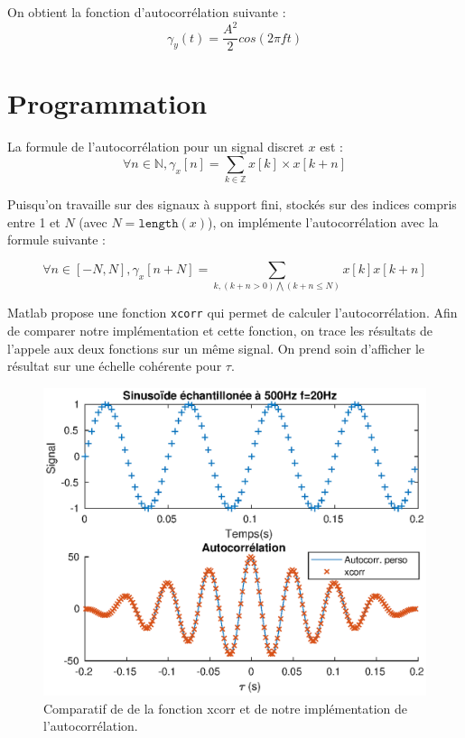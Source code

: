 \documentclass[french]{article}
\begin{document}
On obtient la fonction d'autocorrélation suivante :
\begin{equation}
\gamma_y (t) = \frac{A^2} {2} cos(2 \pi f t)
\end{equation}

\section{ Programmation}

La formule de l'autocorrélation pour un signal discret $x$ est :
\begin{equation}
\forall n \in \mathbb{N}, \gamma_x [n] = \sum_{k\in \mathbb{Z}} x[k] \times x[k+n]
\end{equation}

Puisqu'on travaille sur des signaux à support fini, stockés sur des indices compris entre 1 et $N$ (avec $N = \mathtt{length}(x)$), on implémente l'autocorrélation avec la formule suivante :

\begin{equation}
\forall n \in [-N,N], \gamma_x [n+N] = \sum_{k, (k+n>0) \bigwedge (k+n \leq N) } x[k]x[k+n]
\end{equation}

Matlab propose une fonction \verb`xcorr` qui permet de calculer l'autocorrélation. Afin de comparer notre implémentation et cette fonction, on trace les résultats de l'appele aux deux fonctions sur un même signal. On prend soin d'afficher le résultat sur une échelle cohérente pour $\tau$.

\begin{figure}[h!]
	\centering
	\includegraphics[height=0.33\textheight]{images/autocorr.eps}
	\caption{Comparatif de de la fonction xcorr et de notre implémentation de l'autocorrélation.}
	\label{autocorr}
\end{figure}
\end{document}
